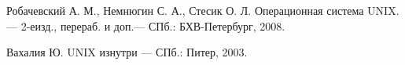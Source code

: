 \newpage

\begin{thebibliography}{99}

 Робачевский А. М., Немнюгин С. А., Стесик О. Л. Операционная система UNIX. — 2-еизд., перераб. и доп.— СПб.: БХВ-Петербург, 2008.

 Вахалия Ю. UNIX изнутри — СПб.: Питер, 2003.
\end{thebibliography}